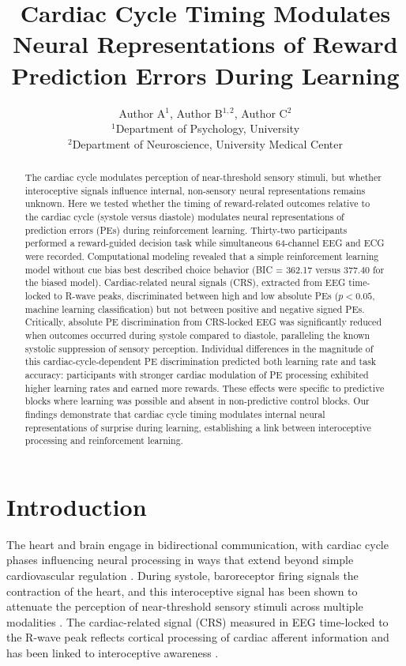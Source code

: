 \documentclass[11pt]{article}
\title{Cardiac Cycle Timing Modulates Neural Representations of Reward Prediction Errors During Learning}
\author{Author A$^{1}$, Author B$^{1,2}$, Author C$^{2}$ \\
\small $^{1}$Department of Psychology, University \\
\small $^{2}$Department of Neuroscience, University Medical Center}
\date{}
\begin{document}
\maketitle

\begin{abstract}
The cardiac cycle modulates perception of near-threshold sensory stimuli, but whether interoceptive signals influence internal, non-sensory neural representations remains unknown. Here we tested whether the timing of reward-related outcomes relative to the cardiac cycle (systole versus diastole) modulates neural representations of prediction errors (PEs) during reinforcement learning. Thirty-two participants performed a reward-guided decision task while simultaneous 64-channel EEG and ECG were recorded. Computational modeling revealed that a simple reinforcement learning model without cue bias best described choice behavior (BIC = 362.17 versus 377.40 for the biased model). Cardiac-related neural signals (CRS), extracted from EEG time-locked to R-wave peaks, discriminated between high and low absolute PEs ($p < 0.05$, machine learning classification) but not between positive and negative signed PEs. Critically, absolute PE discrimination from CRS-locked EEG was significantly reduced when outcomes occurred during systole compared to diastole, paralleling the known systolic suppression of sensory perception. Individual differences in the magnitude of this cardiac-cycle-dependent PE discrimination predicted both learning rate and task accuracy: participants with stronger cardiac modulation of PE processing exhibited higher learning rates and earned more rewards. These effects were specific to predictive blocks where learning was possible and absent in non-predictive control blocks. Our findings demonstrate that cardiac cycle timing modulates internal neural representations of surprise during learning, establishing a link between interoceptive processing and reinforcement learning.
\end{abstract}

\section{Introduction}

The heart and brain engage in bidirectional communication, with cardiac cycle phases influencing neural processing in ways that extend beyond simple cardiovascular regulation \citep{lacey1978cardiac, critchley2004neural}. During systole, baroreceptor firing signals the contraction of the heart, and this interoceptive signal has been shown to attenuate the perception of near-threshold sensory stimuli across multiple modalities \citep{park2014cardiac, baroreceptor_systole2009}. The cardiac-related signal (CRS) measured in EEG time-locked to the R-wave peak reflects cortical processing of cardiac afferent information and has been linked to interoceptive awareness \citep{garfinkel2015knowing, crs_review2018}.
\end{document}
